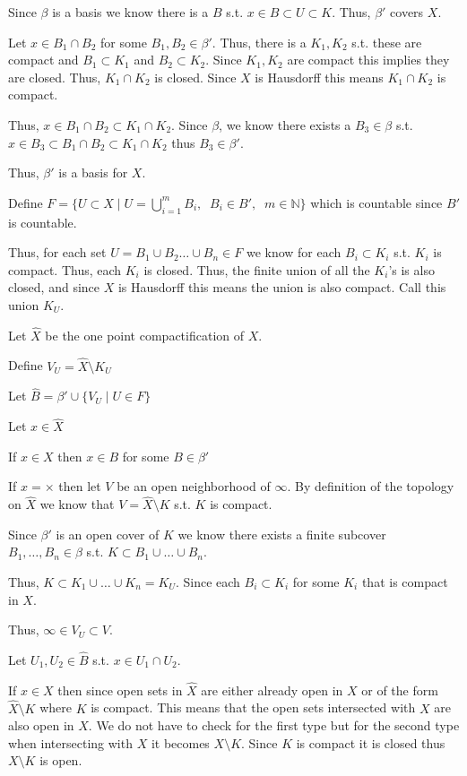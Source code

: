 \documentclass[12pt, letterpaper]{article}
\newcommand{\N}{\mathbb{N}}
\begin{document}
\begin{problemproof}
    Since $\beta$ is a basis we know there is a $B$ s.t. $x \in B \subset U \subset K$. Thus, $\beta'$ covers $X$.

    Let $x \in B_1 \cap B_2$ for some $B_1,B_2 \in \beta'$. Thus, there is a $K_1,K_2$ s.t. these are compact and $B_1 \subset K_1$ and $B_2 \subset K_2$. Since $K_1,K_2$ are compact this implies they are closed. Thus, $K_1 \cap K_2$ is closed. Since $X$ is Hausdorff this means $K_1 \cap K_2$ is compact.

    Thus, $x \in B_1 \cap B_2 \subset K_1 \cap K_2$. Since $\beta$, we know there exists a $B_3 \in \beta$ s.t. $x \in B_3 \subset B_1 \cap B_2 \subset K_1 \cap K_2$ thus $B_3 \in \beta'$.

    Thus, $\beta'$ is a basis for $X$.

    Define $F=\{U \subset X \mid U=\bigcup_{i=1}^m B_i,\;\;B_i \in B',\;\;m \in \N\}$ which is countable since $B'$ is countable.

    Thus, for each set $U=B_1 \cup B_2 \dots \cup B_n \in F$ we know for each $B_i \subset K_i$ s.t. $K_i$ is compact. Thus, each $K_i$ is closed. Thus, the finite union of all the $K_i$'s is also closed, and since $X$ is Hausdorff this means the union is also compact. Call this union $K_U$.

    Let $\hat{X}$ be the one point compactification of $X$. 

    Define $V_U= \hat{X} \setminus K_U$

    Let $\hat{B}=\beta' \cup \{V_U \mid U \in F\}$

    Let $x \in \hat{X}$

    If $x \in X$ then $x \in B$ for some $B \in \beta'$

    If $x = \times$ then let $V$ be an open neighborhood of $\infty$. By definition of the topology on $\hat{X}$ we know that $V=\hat{X} \setminus K$ s.t. $K$ is compact.

    Since $\beta'$ is an open cover of $K$ we know there exists a finite subcover $B_1,\dots,B_n \in \beta$ s.t. $K \subset B_1 \cup \dots \cup B_n$.

    Thus, $K \subset K_1 \cup \dots \cup K_n=K_U$. Since each $B_i \subset K_i$ for some $K_i$ that is compact in $X$.

    Thus, $\infty \in V_U \subset V$.

    Let $U_1,U_2 \in \hat{B}$ s.t. $x \in U_1 \cap U_2$.

    If $x \in X$ then since open sets in $\hat{X}$ are either already open in $X$ or of the form $\hat{X} \setminus K$ where $K$ is compact. This means that the open sets intersected with $X$ are also open in $X$. We do not have to check for the first type but for the second type when intersecting with $X$ it becomes $X \setminus K$. Since $K$ is compact it is closed thus $X \setminus K$ is open.


\end{problemproof}
\end{document}
